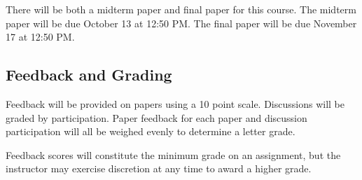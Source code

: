 \documentclass[11pt]{article}
\begin{document}
There will be both a midterm paper and final paper for this course. 
The midterm paper will be due October 13 at 12:50 PM. 
The final paper will be due November 17 at 12:50 PM.


\subsection*{Feedback and Grading}
Feedback will be provided on papers using a 10 point scale.
Discussions will be graded by participation.
Paper feedback for each paper and discussion participation will all be weighed evenly to determine a letter grade.

\noindent Feedback scores will constitute the minimum grade on an assignment, but the instructor
may exercise discretion at any time to award a higher grade.


\end{document}
